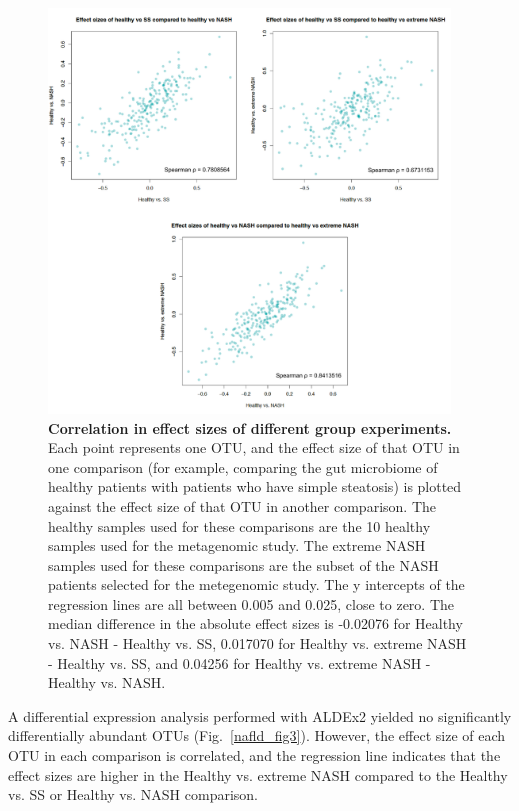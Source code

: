 \begin{figure}[h]
\begin{center}
\includegraphics[width=0.95\textwidth]{nafld_16s_effect_sizes.png}
\caption{\textbf{Correlation in effect sizes of different group experiments.} Each point represents one OTU, and the effect size of that OTU in one comparison (for example, comparing the gut microbiome of healthy patients with patients who have simple steatosis) is plotted against the effect size of that OTU in another comparison. The healthy samples used for these comparisons are the 10 healthy samples used for the metagenomic study. The extreme NASH samples used for these comparisons are the subset of the NASH patients selected for the metegenomic study. The y intercepts of the regression lines are all between 0.005 and 0.025, close to zero. The median difference in the absolute effect sizes is -0.02076 for Healthy vs. NASH - Healthy vs. SS, 0.017070 for Healthy vs. extreme NASH - Healthy vs. SS, and 0.04256 for Healthy vs. extreme NASH - Healthy vs. NASH.}
\end{center}
\label{nafld_fig4}
\end{figure}

A differential expression analysis performed with ALDEx2 yielded no significantly differentially abundant OTUs (Fig.~\ref{nafld_fig3}). However, the effect size of each OTU in each comparison is correlated, and the regression line indicates that the effect sizes are higher in the Healthy vs. extreme NASH compared to the Healthy vs. SS or Healthy vs. NASH comparison.

